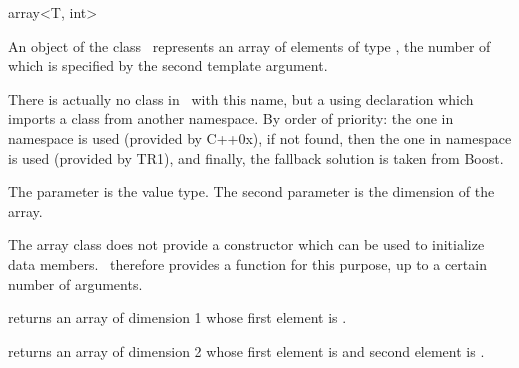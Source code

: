 

\begin{ccRefClass}{array<T, int>}

\ccDefinition

An object of the class \ccClassTemplateName\ represents an array of elements
of type , the number of which is specified by the second template argument.

There is actually no class in \cgal\ with this name, but a using declaration which
imports a class from another namespace.  By order of priority: the one in namespace
 is used (provided by C++0x), if not found, then the one in namespace
 is used (provided by TR1), and finally, the fallback solution 
is taken from Boost.


  \ccParameters

  The parameter  is the value type.  The second parameter is the
  dimension of the array.


  The array class does not provide a constructor which can be used to initialize
  data members.  \cgal\ therefore provides a  function for
  this purpose, up to a certain number of arguments.

  \def\ccTagRmEigenClassName{\ccFalse}
  {returns an array of dimension 1 whose first element is .}

  {returns an array of dimension 2 whose first element is 
   and second element is .}

\end{ccRefClass}

\ccParDims
